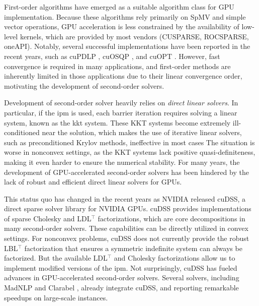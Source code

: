 \documentclass{article}
\begin{document}
First-order algorithms have emerged as a suitable algorithm class for GPU implementation.
Because these algorithms rely primarily on SpMV and simple vector operations, GPU acceleration is less constrained by the availability of low-level kernels, which are provided by most vendors (CUSPARSE, ROCSPARSE, oneAPI). 
Notably, several successful implementations have been reported in the recent years, such as cuPDLP \cite{}, cuOSQP \cite{}, and cuOPT \cite{}.
However, fast convergence is required in many applications, and first-order methods are inherently limited in those applications due to their linear convergence order, motivating the development of second-order solvers.

Development of second-order solver heavily relies on \emph{direct linear solvers}.
In particular, if the \gls*{ipm} is used, each barrier iteration requires solving a linear system, known as the \gls{kkt} system.
These KKT systems become extremely ill-conditioned near the solution, which makes the use of iterative linear solvers, such as preconditioned Krylov methods, ineffective in most cases
The situation is worse in nonconvex settings, as the KKT systems lack positive quasi-definiteness, making it even harder to ensure the numerical stability.
For many years, the development of GPU-accelerated second-order solvers has been hindered by the lack of robust and efficient direct linear solvers for GPUs.

This status quo has changed in the recent years as NVIDIA released cuDSS, a direct sparse solver library for NVIDIA GPUs.
cuDSS provides %
implementations of sparse Cholesky and LDL$^\top$ factorizations, which are core decompositions in many second-order solvers.
These capabilities can be directly utilized in convex settings.
For nonconvex problems, cuDSS does not currently provide the robust LBL$^\top$ factorization that ensures a symmetric indefinite system can always be factorized.
But the available LDL$^\top$ and Cholesky factorizations allow us to implement modified versions of the \gls*{ipm}.
Not surprisingly, cuDSS has fueled advances in GPU-accelerated second-order solvers.
Several solvers, including MadNLP \cite{} and Clarabel \cite{}, already integrate cuDSS, and reporting remarkable speedups on large-scale instances.
\end{document}
